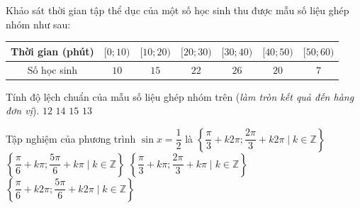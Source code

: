 \begin{ex}%
	Khảo sát thời gian tập thể dục của một số học sinh thu được mẫu số liệu ghép nhóm như sau:
	\begin{center}
		\begin{tabular}{|c|c|c|c|c|c|c|}
			\hline
			Thời gian (phút) & $[0;10)$ & $[10;20)$ & $[20;30)$ & $[30;40)$ & $[40;50)$ & $[50;60)$ \\ \hline
			Số học sinh & $10$ & $15$ & $22$ & $26$ & $20$ & $7$ \\ \hline
		\end{tabular}
	\end{center}
	Tính độ lệch chuẩn của mẫu số liệu ghép nhóm trên (\textit{làm tròn kết quả đến hàng đơn vị}).
	\choice
	{$12$}
	{\True $14$}
	{$15$}
	{$13$}
\end{ex}

\begin{ex}%
	Tập nghiệm của phương trình $\sin x = \dfrac{1}{2}$ là
	\choice
	{$\left\{ \dfrac{\pi}{3} + k2\pi; \dfrac{2\pi}{3} + k2\pi \mid k \in \mathbb{Z} \right\}$}
	{$\left\{ \dfrac{\pi}{6} + k\pi; \dfrac{5\pi}{6} + k\pi \mid k \in \mathbb{Z} \right\}$}
	{$\left\{ \dfrac{\pi}{3} + k\pi; \dfrac{2\pi}{3} + k\pi \mid k \in \mathbb{Z} \right\}$}
	{\True $\left\{ \dfrac{\pi}{6} + k2\pi; \dfrac{5\pi}{6} + k2\pi \mid k \in \mathbb{Z} \right\}$}
\end{ex}

